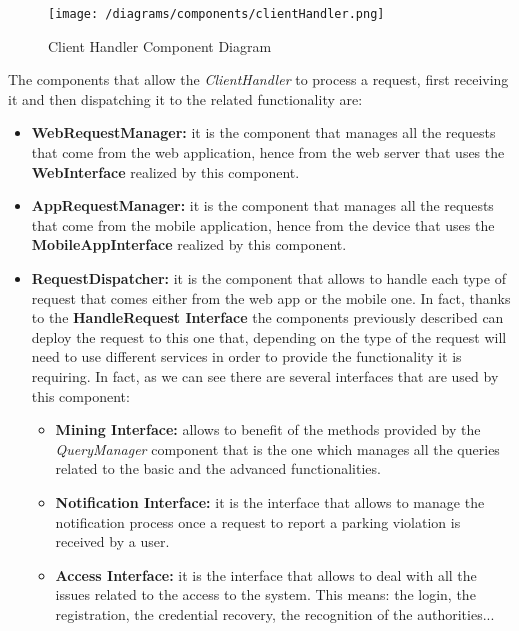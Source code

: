 			\begin{figure}[h!]
				\centering
				\texttt{[image: /diagrams/components/clientHandler.png]}
				\caption{\label{fig:clientHandlerComp} Client Handler Component Diagram}
			\end{figure}
			
			The components that allow the \emph{ClientHandler} to process a request, first receiving it and then dispatching it to the related functionality are:
			
			\begin{itemize}
				\item \textbf{WebRequestManager:} it is the component that manages all the requests that come from the web application, hence from the web server that uses the \textbf{WebInterface} realized by this component.
				
				\item \textbf{AppRequestManager:} it is the component that manages all the requests that come from the mobile application, hence from the device that uses the \textbf{MobileAppInterface} realized by this component.
				
				\item \textbf{RequestDispatcher:} it is the component that allows to handle each type of request that comes either from the web app or the mobile one. In fact, thanks to the \textbf{HandleRequest Interface} the components previously described can deploy the request to this one that, depending on the type of the request will need to use different services in order to provide the functionality it is requiring. In fact, as we can see there are several interfaces that are used by this component:
				
				\begin{itemize}
					\item \textbf{Mining Interface:} allows to benefit of the methods provided by the \emph{QueryManager} component that is the one which manages all the queries related to the basic and the advanced functionalities.
					
					\item \textbf{Notification Interface:} it is the interface that allows to manage the notification process once a request to report a parking violation is received by a user.
					
					\item \textbf{Access Interface:} it is the interface that allows to deal with all the issues related to the access to the system. This means: the login, the registration, the credential recovery, the recognition of the authorities...
					

\end{itemize}
\end{itemize}
